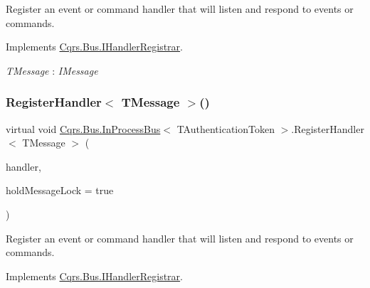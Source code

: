 Register an event or command handler that will listen and respond to events or commands. 



Implements \hyperlink{interfaceCqrs_1_1Bus_1_1IHandlerRegistrar_ab6ca4dfdc54a5aeebe4651dbdb479f55_ab6ca4dfdc54a5aeebe4651dbdb479f55}{Cqrs.\+Bus.\+I\+Handler\+Registrar}.

\begin{Desc}
\item[Type Constraints]\begin{description}
\item[{\em T\+Message} : {\em I\+Message}]\end{description}
\end{Desc}
\mbox{\label{classCqrs_1_1Bus_1_1InProcessBus_a62171e3c6d155cfdfd921b07b4909adf_a62171e3c6d155cfdfd921b07b4909adf}} 
\subsubsection{\texorpdfstring{Register\+Handler$<$ T\+Message $>$()}{RegisterHandler< TMessage >()}\hspace{0.1cm}{\footnotesize\ttfamily [2/2]}}
{\footnotesize\ttfamily virtual void \hyperlink{classCqrs_1_1Bus_1_1InProcessBus}{Cqrs.\+Bus.\+In\+Process\+Bus}$<$ T\+Authentication\+Token $>$.Register\+Handler$<$ T\+Message $>$ (\begin{DoxyParamCaption}\item[{Action$<$ T\+Message $>$}]{handler,  }\item[{bool}]{hold\+Message\+Lock = {\ttfamily true} }\end{DoxyParamCaption})\hspace{0.3cm}{\ttfamily [virtual]}}



Register an event or command handler that will listen and respond to events or commands. 



Implements \hyperlink{interfaceCqrs_1_1Bus_1_1IHandlerRegistrar_a07792dcc9a8b272709ff2e2dd336a642_a07792dcc9a8b272709ff2e2dd336a642}{Cqrs.\+Bus.\+I\+Handler\+Registrar}.

